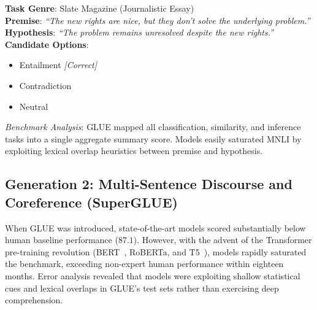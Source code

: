 \documentclass[../../../main.tex]{subfiles}
\begin{document}
\begin{center}
\begin{minipage}{0.95\textwidth}
\begin{tcolorbox}[colback=cardBg,colframe=cardLine,arc=2pt,boxrule=0.5pt,title=\textbf{GLUE Benchmark Example: Multi-Genre Natural Language Inference (MNLI)}]
\small\sffamily
\textbf{Task Genre}: Slate Magazine (Journalistic Essay) \\
\textbf{Premise}: \textit{``The new rights are nice, but they don't solve the underlying problem.''} \\
\textbf{Hypothesis}: \textit{``The problem remains unresolved despite the new rights.''} \\
\textbf{Candidate Options}:
\begin{itemize}[leftmargin=1.5em,itemsep=1pt]
    \item[\textbf{(A)}] Entailment \hfill \textit{[Correct]}
    \item[\textbf{(B)}] Contradiction
    \item[\textbf{(C)}] Neutral
\end{itemize}
\textit{Benchmark Analysis}: GLUE mapped all classification, similarity, and inference tasks into a single aggregate summary score. Models easily saturated MNLI by exploiting lexical overlap heuristics between premise and hypothesis.
\end{tcolorbox}
\end{minipage}
\end{center}

\subsection{Generation 2: Multi-Sentence Discourse and Coreference (SuperGLUE)}
\label{subsec:glue_superglue}

When GLUE was introduced, state-of-the-art models scored substantially below human baseline performance ($87.1$). However, with the advent of the Transformer pre-training revolution (BERT~\cite{devlin2019}, RoBERTa, and T5~\cite{raffel2020t5}), models rapidly saturated the benchmark, exceeding non-expert human performance within eighteen months. Error analysis revealed that models were exploiting shallow statistical cues and lexical overlaps in GLUE's test sets rather than exercising deep comprehension.
\end{document}
